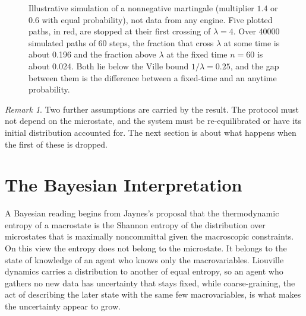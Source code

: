 \documentclass[11pt]{article}
\theoremstyle{definition}
\theoremstyle{remark}
\newtheorem{remark}{Remark}
\begin{document}
\begin{figure}[tbp]
{\begin{tikzpicture}[font=\small]
\end{tikzpicture}
}
\caption{Illustrative simulation of a nonnegative martingale (multiplier $1.4$ or $0.6$ with equal probability), not data from any engine. Five plotted paths, in red, are stopped at their first crossing of $\lambda = 4$. Over 40000 simulated paths of 60 steps, the fraction that cross $\lambda$ at some time is about 0.196 and the fraction above $\lambda$ at the fixed time $n = 60$ is about 0.024. Both lie below the Ville bound $1/\lambda = 0.25$, and the gap between them is the difference between a fixed-time and an anytime probability.}
\label{fig:ville}
\end{figure}


\begin{remark}
Two further assumptions are carried by the result. The protocol must not depend on the microstate, and the system must be re-equilibrated or have its initial distribution accounted for. The next section is about what happens when the first of these is dropped.
\end{remark}

\section{The Bayesian Interpretation}

A Bayesian reading begins from Jaynes's proposal \cite{jaynes1957} that the thermodynamic entropy of a macrostate is the Shannon entropy of the distribution over microstates that is maximally noncommittal given the macroscopic constraints. On this view the entropy does not belong to the microstate. It belongs to the state of knowledge of an agent who knows only the macrovariables. Liouville dynamics carries a distribution to another of equal entropy, so an agent who gathers no new data has uncertainty that stays fixed, while coarse-graining, the act of describing the later state with the same few macrovariables, is what makes the uncertainty appear to grow.
\end{document}
